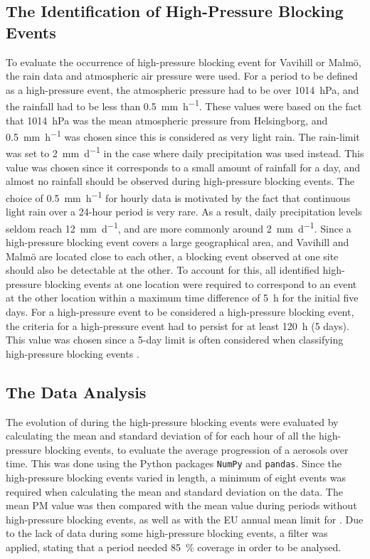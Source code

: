 \subsection{The Identification of High-Pressure Blocking Events}
To evaluate the occurrence of high-pressure blocking event for Vavihill or Malmö, the rain data and atmospheric air pressure were used. For a period to be defined as a high-pressure event, the atmospheric pressure had to be over \SI{1014}{\hecto\pascal}, and the rainfall had to be less than \SI{0.5}{\mm\per\hour}. These values were based on the fact that \SI{1014}{\hecto\pascal} was the mean atmospheric pressure from Helsingborg, and \SI{0.5}{\mm\per\hour} was chosen since this is considered as very light rain. The rain-limit was set to \SI{2}{\mm\per\day} in the case where daily precipitation was used instead. This value was chosen since it corresponds to a small amount of rainfall for a day, and almost no rainfall should be observed during high-pressure blocking events. The choice of \SI{0.5}{\mm\per\hour} for hourly data is motivated by the fact that continuous light rain over a 24-hour period is very rare. As a result, daily precipitation levels seldom reach \SI{12}{\mm\per\day}, and are more commonly around \SI{2}{\mm\per\day}. Since a high-pressure blocking event covers a large geographical area, and Vavihill and Malmö are located close to each other, a blocking event observed at one site should also be detectable at the other. To account for this, all identified high-pressure blocking events at one location were required to correspond to an event at the other location within a maximum time difference of \SI{5}{\hour} for the initial five days. For a high-pressure event to be considered a high-pressure blocking event, the criteria for a high-pressure event had to persist for at least \SI{120}{\hour} (5 days). This value was chosen since a 5-day limit is often considered when classifying high-pressure blocking events \cite{lupoAtmosphericBlockingEvents2020}. 

\subsection{The Data Analysis}
The evolution of \PM during the high-pressure blocking events were evaluated by calculating the mean and standard deviation of \PM for each hour of all the high-pressure blocking events, to evaluate the average progression of a aerosols over time. This was done using the Python packages \texttt{NumPy} and \texttt{pandas}. Since the high-pressure blocking events varied in length, a minimum of eight events was required when calculating the mean and standard deviation on the \PM data. The mean PM value was then compared with the mean \PM value during periods without high-pressure blocking events, as well as with the EU annual mean limit for \PM. Due to the lack of \PM data during some high-pressure blocking events, a filter was applied, stating that a period needed \SI{85}{\%} \PM coverage in order to be analysed.

